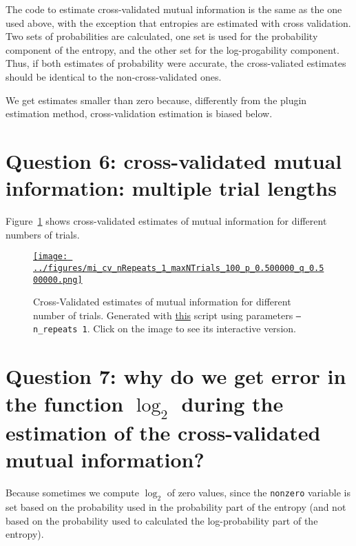 \documentclass[12pt]{article}
\begin{document}
The code to estimate cross-validated mutual information is the same as the one
used above, with the exception that entropies are estimated with cross
validation. Two sets of probabilities are calculated, one set is used for the
probability component of the entropy, and the other set for the log-progability
component. Thus, if both estimates of probability were accurate, the
cross-valiated estimates should be identical to the non-cross-validated ones.

We get estimates smaller than zero because, differently from the plugin
estimation method, cross-validation estimation is biased below.

\section*{Question 6: cross-validated mutual information: multiple trial lengths}

Figure~\ref{fig:miEstimatesCVMultiTrial} shows cross-validated estimates of mutual
information for different numbers of trials.

\begin{figure}[H]
    \begin{center}
        \href{https://www.gatsby.ucl.ac.uk/~rapela/neuroinformatics/2023/ws8/figures/mi_cv_nRepeats_1_maxNTrials_100_p_0.500000_q_0.500000.html}{\texttt{[image: ../figures/mi\_cv\_nRepeats\_1\_maxNTrials\_100\_p\_0.500000\_q\_0.500000.png]}}

        \caption{Cross-Validated estimates of mutual information for different number of trials.
        Generated with
        \href{https://github.com/joacorapela/neuroinformatics23/blob/master/worksheets/ws8/mySolution/code/scripts/doEstimateMI_cv_multiTrials.py}{this}
        script using parameters \texttt{--n\_repeats 1}. Click on the image to see its
        interactive version.}

        \label{fig:miEstimatesCVMultiTrial}
    \end{center}
\end{figure}

\section*{Question 7: why do we get error in the function $\log_2$ during the estimation of the cross-validated mutual information?}

Because sometimes we compute $\log_2$ of zero values, since the
\texttt{nonzero} variable is set based on the probability used in the
probability part of the entropy (and not based on the probability used to
calculated the log-probability part of the entropy).
\end{document}
